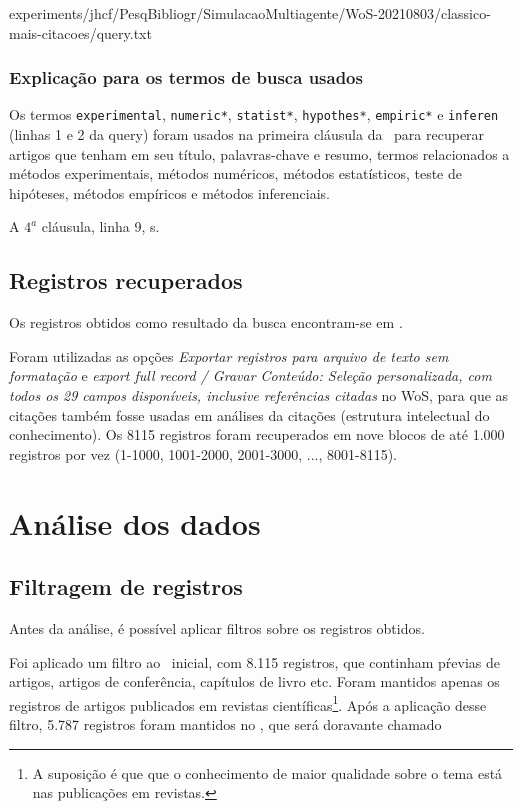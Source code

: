 
{experiments/jhcf/PesqBibliogr/SimulacaoMultiagente/WoS-20210803/classico-mais-citacoes/query.txt}

\subsubsection{Explicação para os termos de busca usados\label{}}


Os termos \texttt{experimental}, \texttt{numeric*}, \texttt{statist*}, \texttt{hypothes*}, 
\texttt{empiric*}
e \texttt{inferen} (linhas 1 e 2 da query) foram usados na primeira cláusula da \query\  para recuperar artigos que tenham em seu título, palavras-chave e resumo, termos relacionados a métodos experimentais,
métodos numéricos,
métodos estatísticos,
teste de hipóteses,
métodos empíricos e métodos inferenciais.


A $4^{a}$ cláusula, linha 9,  s.

\subsection{Registros recuperados}

Os  registros obtidos como resultado da busca encontram-se em \url{}. 

Foram utilizadas as opções \textit{Exportar registros para arquivo de texto sem formatação} e \textit{export full record / Gravar Conteúdo: Seleção personalizada, com todos os 29 campos disponíveis, inclusive referências citadas} no WoS, para que as citações também fosse usadas em análises da citações (estrutura intelectual do conhecimento). Os 8115 registros foram recuperados em nove blocos de até 1.000 registros por vez (1-1000, 1001-2000, 2001-3000, ..., 8001-8115).


\section{Análise dos dados}

\subsection{Filtragem de registros}
Antes da análise, é possível aplicar filtros sobre os registros obtidos.

Foi aplicado um filtro ao \dataset\   inicial, com 8.115 registros, que continham pŕevias de artigos, artigos de conferência, capítulos de livro etc. Foram mantidos apenas os registros de artigos publicados em revistas científicas\footnote{A suposição é que que o conhecimento de maior qualidade sobre o tema está nas publicações em revistas.}. Após a aplicação desse filtro, 5.787 registros foram mantidos no \dataset, que será doravante chamado


